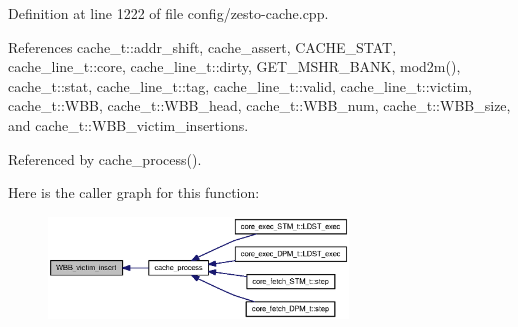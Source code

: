 Definition at line 1222 of file config/zesto-cache.cpp.

References cache\_\-t::addr\_\-shift, cache\_\-assert, CACHE\_\-STAT, cache\_\-line\_\-t::core, cache\_\-line\_\-t::dirty, GET\_\-MSHR\_\-BANK, mod2m(), cache\_\-t::stat, cache\_\-line\_\-t::tag, cache\_\-line\_\-t::valid, cache\_\-line\_\-t::victim, cache\_\-t::WBB, cache\_\-t::WBB\_\-head, cache\_\-t::WBB\_\-num, cache\_\-t::WBB\_\-size, and cache\_\-t::WBB\_\-victim\_\-insertions.

Referenced by cache\_\-process().

Here is the caller graph for this function:\nopagebreak
\begin{figure}[H]
\begin{center}
\leavevmode
\includegraphics[width=226pt]{config_2zesto-cache_8cpp_4a2ea45f307de25eaffcd48354e67a18_icgraph}
\end{center}
\end{figure}
